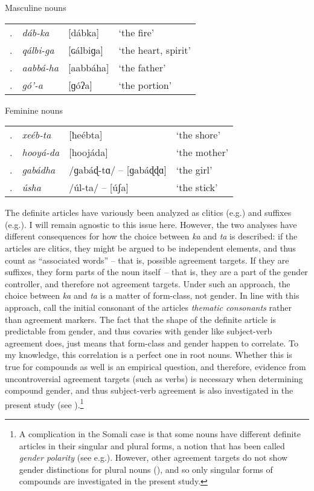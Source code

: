 \documentclass[output=paper]{langscibook}
\begin{document}
\ea\label{ex:kaldhol:mnouns}
	Masculine nouns \\
	\begin{tabular}{@{}llll@{}}
		\myletter. & \textit{dáb-ka}   & {[dábka]}   & `the fire'          \\
		\myletter. & \textit{qálbi-ga} & {[ɢálbiɡa]} & `the heart, spirit' \\
		\myletter. & \textit{aabbá-ha} & {[aabbáha]} & `the father'        \\
		\myletter. & \textit{gó'-a}    & {[ɡóʔa]}    & `the portion'
	\end{tabular}\setcounter{mycounter}{0}	
\ex\label{ex:kaldhol:fnouns}
	Feminine nouns \\
	\begin{tabular}{@{}llll@{}}
		\myletter. & \textit{xeéb-ta}     & {[ħeébta]}                & `the shore'         \\
		\myletter. & \textit{hooyá-da} & {[hoojáda]}             & `the mother' \\
		\myletter. & \textit{gabádha}     & /ɡabáɖ-tɑ/ -- {[ɡabáɖɖɑ]} & `the girl'          \\
		\myletter. & \textit{úsha}        & /úl-ta/  -- {[úʃa]}       & `the stick'
	\end{tabular}\setcounter{mycounter}{0}
\z
The definite articles have variously been analyzed as clitics (e.g.\@ \citealt{Green2016}) and suffixes (e.g.\@ \citealt{Nilsson2016}). I will remain agnostic to this issue here. However, the two analyses have different consequences for how the choice between \textit{ka} and \textit{ta} is described: if the articles are clitics, they might be argued to be independent elements, and thus count as ``associated words'' -- that is, possible agreement targets. If they are suffixes, they form parts of the noun itself~-- that is, they are a part of the gender controller, and therefore not agreement targets. Under such an approach, the choice between \textit{ka} and \textit{ta} is a matter of form-class, not gender. In line with this approach, \textcite{Gueldemann2016} call the initial consonant of the articles \textit{thematic consonants} rather than agreement markers. The fact that the shape of the definite article is predictable from gender, and thus covaries with gender like subject-verb agreement does, just means that form-class and gender happen to correlate. To my knowledge, this correlation is a perfect one in root nouns. Whether this is true for compounds as well is an empirical question, and therefore, evidence from uncontroversial agreement targets (such as verbs) is necessary when determining compound gender, and thus subject-verb agreement is also investigated in the present study (see ).\footnote{A complication in the Somali case is that some nouns have different definite articles in their singular and plural forms, a notion that has been called \textit{gender polarity} (see e.g.\@ \citealt{Lecarme2002,Lampitelli2013,Nilsson2016}). However, other agreement targets do not show gender distinctions for plural nouns (\citealt{Nilsson2016}), and so only singular forms of compounds are investigated in the present study.}
\end{document}
